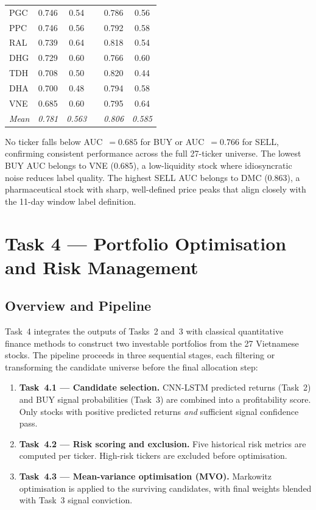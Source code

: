 \documentclass[12pt, a4paper]{article}
\begin{document}
\begin{table}[h]
\begin{tabular}{l cc c cc}
PGC   & 0.746 & 0.54 && 0.786 & 0.56 \\
PPC   & 0.746 & 0.56 && 0.792 & 0.58 \\
RAL   & 0.739 & 0.64 && 0.818 & 0.54 \\
DHG   & 0.729 & 0.60 && 0.766 & 0.60 \\
TDH   & 0.708 & 0.50 && 0.820 & 0.44 \\
DHA   & 0.700 & 0.48 && 0.794 & 0.58 \\
VNE   & 0.685 & 0.60 && 0.795 & 0.64 \\
\hline
\textit{Mean} & \textit{0.781} & \textit{0.563}
&& \textit{0.806} & \textit{0.585} \\
\hline
\end{tabular}
\end{table}


No ticker falls below AUC~$= 0.685$ for BUY or AUC~$= 0.766$
for SELL, confirming consistent performance across the full
27-ticker universe. The lowest BUY AUC belongs to VNE (0.685),
a low-liquidity stock where idiosyncratic noise reduces label
quality. The highest SELL AUC belongs to DMC (0.863), a
pharmaceutical stock with sharp, well-defined price peaks that
align closely with the 11-day window label definition.

\section{Task 4 --- Portfolio Optimisation and Risk Management}

\subsection{Overview and Pipeline}

Task~4 integrates the outputs of Tasks~2 and~3 with classical
quantitative finance methods to construct two investable portfolios
from the 27 Vietnamese stocks. The pipeline proceeds in three
sequential stages, each filtering or transforming the candidate
universe before the final allocation step:

\begin{enumerate}
  \item \textbf{Task~4.1 --- Candidate selection.} CNN-LSTM predicted
    returns (Task~2) and BUY signal probabilities (Task~3) are combined
    into a profitability score. Only stocks with positive predicted
    returns \emph{and} sufficient signal confidence pass.
  \item \textbf{Task~4.2 --- Risk scoring and exclusion.} Five
    historical risk metrics are computed per ticker. High-risk tickers
    are excluded before optimisation.
  \item \textbf{Task~4.3 --- Mean-variance optimisation (MVO).}
    Markowitz optimisation is applied to the surviving candidates,
    with final weights blended with Task~3 signal conviction.
\end{enumerate}
\end{document}
